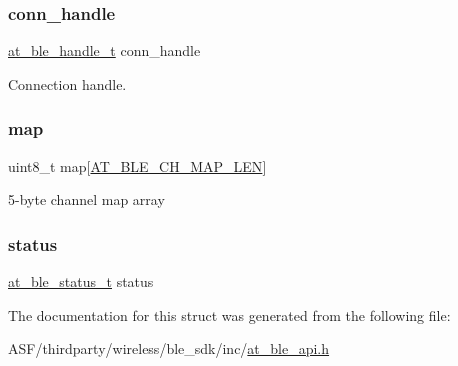 \subsubsection{\texorpdfstring{conn\_handle}{conn\_handle}}
{\footnotesize\ttfamily \mbox{\hyperlink{at__ble__api_8h_abd23646d0c662860741f787efc8456f2}{at\+\_\+ble\+\_\+handle\+\_\+t}} conn\+\_\+handle}



Connection handle. 

\mbox{\label{structat__ble__channel__map__t_a527caa0b30295896bbac2ecf6c4fe3c9}} 
\subsubsection{\texorpdfstring{map}{map}}
{\footnotesize\ttfamily uint8\+\_\+t map\mbox{[}\mbox{\hyperlink{at__ble__api_8h_a37a6c24e6d883e348476b9d3d0b067c2}{A\+T\+\_\+\+B\+L\+E\+\_\+\+C\+H\+\_\+\+M\+A\+P\+\_\+\+L\+EN}}\mbox{]}}



5-\/byte channel map array 

\mbox{\label{structat__ble__channel__map__t_a0b48093fc2030779fc47e5216f8019e2}} 
\subsubsection{\texorpdfstring{status}{status}}
{\footnotesize\ttfamily \mbox{\hyperlink{group__error__codes__group_ga3b1db9b95feb157b3c188ca27fe76988}{at\+\_\+ble\+\_\+status\+\_\+t}} status}



The documentation for this struct was generated from the following file\+:\begin{DoxyCompactItemize}
\item 
A\+S\+F/thirdparty/wireless/ble\+\_\+sdk/inc/\mbox{\hyperlink{at__ble__api_8h}{at\+\_\+ble\+\_\+api.\+h}}\end{DoxyCompactItemize}
